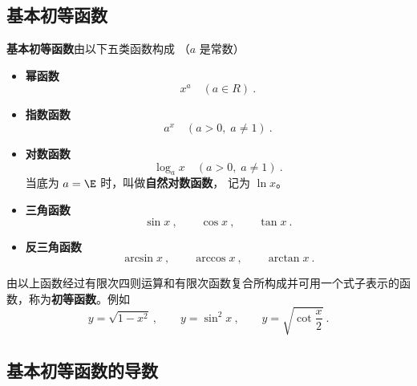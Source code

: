 

\subsection{基本初等函数}
\textbf{基本初等函数}由以下五类函数构成 （$a$ 是常数）

\begin{itemize}
\item \textbf{幂函数}
\begin{equation}\label{eq_FunDer_3}
x^a \quad(a \in R)~.
\end{equation}
\item \textbf{指数函数}
\begin{equation}
a^x \quad(a > 0, \; a \ne 1)~.
\end{equation}
\item \textbf{对数函数}
\begin{equation}
\log_a x \quad(a > 0, \; a \ne 1)~.
\end{equation}
当底为 $a = \E$ 时，叫做\textbf{自然对数函数}， 记为 $\ln x$。
\item \textbf{三角函数}
\begin{equation}
\sin x~, \qquad  \cos x ~,\qquad \tan x~.
\end{equation}
\item \textbf{反三角函数}
\begin{equation}
\arcsin x  ~,\qquad \arccos x ~, \qquad \arctan x~.
\end{equation}
\end{itemize}

由以上函数经过有限次四则运算和有限次函数复合所构成并可用一个式子表示的函数，称为\textbf{初等函数}。例如
\begin{equation}
y = \sqrt{1 - x^2}~,\qquad y = \sin ^2 x~,\qquad y = \sqrt{\cot \frac{x}{2}} ~.
\end{equation}

\subsection{基本初等函数的导数}

